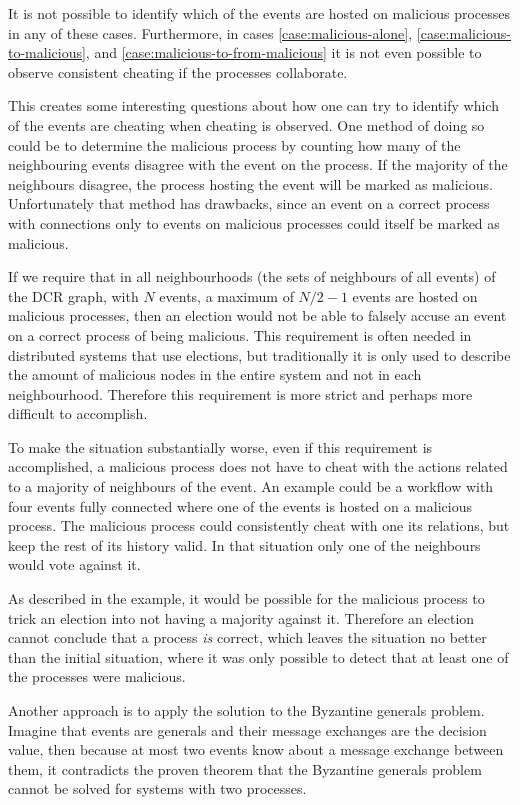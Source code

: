 	\newpar It is not possible to identify which of the events are hosted on malicious processes in any of these cases. Furthermore, in cases \ref{case:malicious-alone}, \ref{case:malicious-to-malicious}, and \ref{case:malicious-to-from-malicious} it is not even possible to observe consistent cheating if the processes collaborate.
	
	\newpar This creates some interesting questions about how one can try to identify which of the events are cheating when cheating is observed. One method of doing so could be to determine the malicious process by counting how many of the neighbouring events disagree with the event on the process. If the majority of the neighbours disagree, the process hosting the event will be marked as malicious. Unfortunately that method has drawbacks, since an event on a correct process with connections only to events on malicious processes could itself be marked as malicious. 
	
	If we require that in all neighbourhoods (the sets of neighbours of all events) of the DCR graph, with $N$ events, a maximum of $N/2-1$ events are hosted on malicious processes, then an election would not be able to falsely accuse an event on a correct process of being malicious. This requirement is often needed in distributed systems that use elections, but traditionally it is only used to describe the amount of malicious nodes in the entire system and not in each neighbourhood. Therefore this requirement is more strict and perhaps more difficult to accomplish.
	
	To make the situation substantially worse, even if this requirement is accomplished, a malicious process does not have to cheat with the actions related to a majority of neighbours of the event. An example could be a workflow with four events fully connected where one of the events is hosted on a malicious process. The malicious process could consistently cheat with one its relations, but keep the rest of its history valid. In that situation only one of the neighbours would vote against it. 
	
	As described in the example, it would be possible for the malicious process to trick an election into not having a majority against it. Therefore an election cannot conclude that a process \textit{is} correct, which leaves the situation no better than the initial situation, where it was only possible to detect that at least one of the processes were malicious.
	
	\newpar Another approach is to apply the solution to the Byzantine generals problem. Imagine that events are generals and their message exchanges are the decision value, then because at most two events know about a message exchange between them, it contradicts the proven theorem that the Byzantine generals problem cannot be solved for systems with two processes.
	
